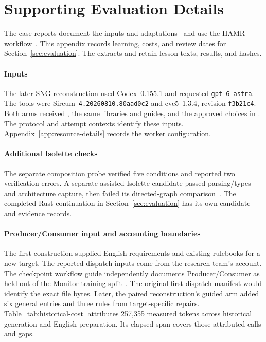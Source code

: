 \section{Supporting Evaluation Details}
\label{app:evaluation-details}
\suppressfloats[t]
The case reports document the inputs and adaptations~\cite{isoletteConsolidatedReport2026,producerConsumerConsolidatedReport2026,sngFinalReport2026} and use the HAMR workflow~\cite{hatcliff2024isolette,hamrTutorials2026}. This appendix records learning, costs, and review dates for Section~\ref{sec:evaluation}. The extracts  and  retain lesson texts, results, and hashes.

\paragraph{Inputs}
The later SNG reconstruction used Codex~0.155.1 and requested \texttt{gpt-6-astra}. The tools were Sireum~\texttt{4.20260810.80aad0c2} and cvc5~1.3.4, revision \texttt{f3b21c4}. Both arms received , the same libraries and guides, and the approved choices in . The protocol and attempt contexts identify these inputs. Appendix~\ref{app:resource-details} records the worker configuration.

\paragraph{Additional Isolette checks}
The separate composition probe verified five conditions and reported two verification errors. A separate assisted Isolette candidate passed parsing/types and architecture capture, then failed its directed-graph comparison~\cite{isoletteConsolidatedReport2026,checkpointResults}. The completed Rust continuation in Section~\ref{sec:evaluation} has its own candidate and evidence records.

\paragraph{Producer/Consumer input and accounting boundaries}
The first construction supplied English requirements and existing rulebooks for a new target. The reported dispatch inputs come from the research team's account. The checkpoint workflow guide independently documents Producer/\allowbreak{}Consumer as held out of the Monitor training split~\cite{scpCheckpoint}. The original first-dispatch manifest would identify the exact file bytes. Later, the paired reconstruction's guided arm added six general entries and three rules from target-specific repairs. Table~\ref{tab:historical-cost} attributes 257,355 measured tokens across historical generation and English preparation. Its elapsed span covers those attributed calls and gaps.

